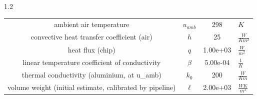\documentclass[preview]{standalone}
\begin{document}
\begin{spacing}{1.2}
\begin{tabular}{cccl}
\toprule
ambient air temperature & $u_{amb}$ & 298 & $K$ \\ 
convective heat transfer coefficient (air) & $h$ & 25 & $\frac{W}{K m^2}$ \\ 
heat flux (chip) & $q$ & 1.00e+03 & $\frac{W}{m^2}$ \\ 
linear temperature coefficient of conductivity & $\beta$ & 5.00e-04 & $\frac{1}{K}$ \\ 
thermal conductivity (aluminium, at u_amb) & $k_{0}$ & 200 & $\frac{W}{K m}$ \\ 
volume weight (initial estimate, calibrated by pipeline) & $\ell$ & 2.00e+03 & $\frac{W K}{m^3}$ \\ 
\bottomrule
\end{tabular}
\end{spacing}
\end{document}
